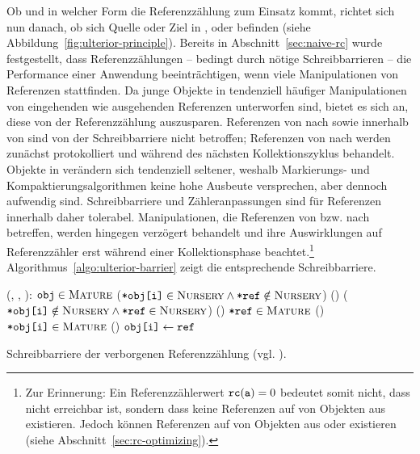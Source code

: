 Ob und in welcher Form die Referenzzählung zum Einsatz kommt, richtet sich nun danach, ob sich Quelle oder Ziel in \Roots, \Nursery oder \Mature befinden (siehe Abbildung~\ref{fig:ulterior-principle}).
Bereits in Abschnitt~\ref{sec:naive-rc} wurde festgestellt, dass Referenzzählungen -- bedingt durch nötige Schreibbarrieren -- die Performance einer Anwendung beeinträchtigen, wenn viele Manipulationen von Referenzen stattfinden.
Da junge Objekte in \Nursery tendenziell häufiger Manipulationen von eingehenden wie ausgehenden Referenzen unterworfen sind, bietet es sich an, diese von der Referenzzählung auszusparen.
Referenzen von \Roots nach \Nursery sowie innerhalb von \Nursery sind von der Schreibbarriere nicht betroffen; Referenzen von \Mature nach \Nursery werden zunächst protokolliert und während des nächsten Kollektionszyklus behandelt.
Objekte in \Mature verändern sich tendenziell seltener, weshalb Markierungs- und Kompaktierungsalgorithmen keine hohe Ausbeute versprechen, aber dennoch aufwendig sind.
Schreibbarriere und Zähleranpassungen sind für Referenzen innerhalb \Mature daher tolerabel.
Manipulationen, die Referenzen von \Roots bzw. \Nursery nach \Mature betreffen, werden hingegen verzögert behandelt und ihre Auswirklungen auf Referenzzähler erst während einer Kollektionsphase beachtet.\footnote{Zur Erinnerung: Ein Referenzzählerwert $\texttt{rc}(\texttt{a}) = 0$ bedeutet somit nicht, dass  nicht erreichbar ist, sondern dass keine Referenzen auf  von Objekten aus \Mature existieren. Jedoch können Referenzen auf  von Objekten aus \Roots oder \Nursery existieren (siehe Abschnitt~\ref{sec:rc-optimizing}).}
Algorithmus~\ref{algo:ulterior-barrier} zeigt die entsprechende Schreibbarriere.

\begin{algorithm}[h]
\begin{algorithmic}[1]
	\State {}(, , ):
	\State \quad \IF $\texttt{obj} \in \textsc{Mature}$
	\State \quad \quad \Atomic
	\State \quad \quad \quad \IF ($\texttt{*obj[i]} \in \textsc{Nursery} \wedge \texttt{*ref} \notin \textsc{Nursery}$)	
	\State \quad \quad \quad \quad {}()	
	\State \quad \quad \quad \ELSE \IF ($\texttt{*obj[i]} \notin \textsc{Nursery} \wedge \texttt{*ref} \in \textsc{Nursery}$)
	\State \quad \quad \quad \quad {}()	
	\State \quad \quad \quad \IF $\texttt{*ref} \in \textsc{Mature}$		
	\State \quad \quad \quad \quad {}()
	\State \quad \quad \quad \IF $\texttt{*obj[i]} \in \textsc{Mature}$
	\State \quad \quad \quad \quad {}()
	\State \quad $\texttt{obj[i]} \gets \texttt{ref}$
\end{algorithmic}
\caption[Schreibbarriere der verborgenen Referenzzählung]{Schreibbarriere der verborgenen Referenzzählung (vgl. \cite[S. 346ff]{blackburn2003}).}
\label{algo:ulterior-barrier}
\end{algorithm}

